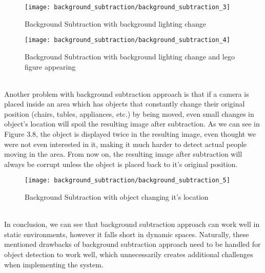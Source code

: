 	\begin{figure}[ht]
		\begin{center}
		\texttt{[image: background\_subtraction/background\_subtraction\_3]}
		\caption{Background Subtraction with background lighting change}
		\end{center}
	\end{figure}
	\begin{figure}[ht]
		\begin{center}
		\texttt{[image: background\_subtraction/background\_subtraction\_4]}
		\caption{Background Subtraction with background lighting change and lego figure appearing}
		\end{center}
	\end{figure}
	\\Another problem with background subtraction approach is that if a camera is placed inside an area which has objects that constantly change their original position (chairs, tables, appliances, etc.) by being moved, even small changes in object's location will spoil the resulting image after subtraction. As we can see in Figure 3.8, the object is displayed twice in the resulting image, even thought we were not even interested in it, making it much harder to detect actual people moving in the area. From now on, the resulting image after subtraction will always be corrupt unless the object is placed back to it's original position.
	\begin{figure}[ht]
		\begin{center}
		\texttt{[image: background\_subtraction/background\_subtraction\_5]}
		\caption{Background Subtraction with object changing it's location}
		\end{center}
	\end{figure}
	\\In conclusion, we can see that background subtraction approach can work well in static environments, however it falls short in dynamic spaces. Naturally, these mentioned drawbacks of background subtraction approach need to be handled for object detection to work well, which unnecessarily creates additional challenges when implementing the system.
